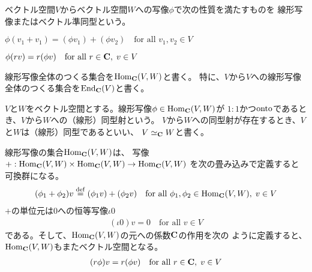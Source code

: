 	\begin{definition}[線形写像]\label{def:線形写像} %
		ベクトル空間$V$からベクトル空間$W$への写像$\phi$で次の性質を満たすものを
		線形写像またはベクトル準同型という。
		\begin{description}\setlength{\itemsep}{-1mm} %
			\item[加法] $
			\phi(v_1 + v_1) = (\phi v_1) + (\phi v_2)
			\quad\text{for all }v_1,v_2\in V
			$
			\item[係数] $
			\phi(rv) = r(\phi v) \quad\text{for all }r\in{\ensuremath{\mathbf{C}}},\;v\in V
			$
		\end{description} %
		線形写像全体のつくる集合を$\operatorname{Hom}_{{\mathbf{C}}}(V,W)$と書く。
		特に、$V$から$V$への線形写像全体のつくる集合を$\operatorname{End}_{{\mathbf{C}}}(V)$と書く。
	\end{definition} %

	\begin{definition}[線形同型]\label{def:線形同型} %
		$V$と$W$をベクトル空間とする。線形写像$\phi\in\operatorname{Hom}_{{\mathbf{C}}}(V,W)$が
		$1:1$かつ$\operatorname{onto}$であるとき、$V$から$W$への（線形）同型射という。
		$V$から$W$への同型射が存在するとき、$V$と$W$は（線形）同型であるといい、
		$V\simeq_{{\mathbf{C}}} W$と書く。
	\end{definition} %

	\begin{note}[線形写像はベクトル空間]\label{note:線形写像はベクトル空間} %
		線形写像の集合$\operatorname{Hom}_{{\mathbf{C}}}(V,W)$は、
		写像$+:\operatorname{Hom}_{{\mathbf{C}}}(V,W)\times\operatorname{Hom}_{{\mathbf{C}}}(V,W)\to\operatorname{Hom}_{{\mathbf{C}}}(V,W)$
		を次の畳み込みで定義すると可換群になる。
		\begin{equation*}\begin{split} %
			(\phi_1+\phi_2)v \defeq (\phi_1 v) + (\phi_2 v)
			\quad\text{for all }\phi_1,\phi_2\in\Hom_\fukuso(V,W),\;v\in V
		\end{split}\end{equation*} %
		$+$の単位元は$0$への恒等写像$\iota0$
		\begin{equation*}\begin{split} %
			(\iota0)v = 0 \quad\text{for all }v\in V
		\end{split}\end{equation*} %
		である。そして、$\operatorname{Hom}_{{\mathbf{C}}}(V,W)$の元への係数${\mathbf{C}}$の作用を次の
		ように定義すると、$\operatorname{Hom}_{{\mathbf{C}}}(V,W)$もまたベクトル空間となる。
		\begin{equation*}\begin{split} %
			(r\phi)v = r(\phi v) \quad\text{for all }r\in\fukuso,\;v\in V
		\end{split}\end{equation*} %
	\end{note} %

